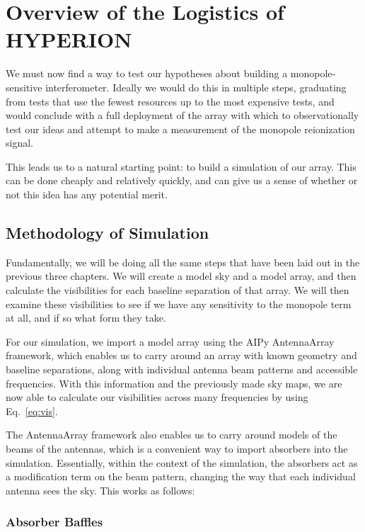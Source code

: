\chapter{Overview of the Logistics of HYPERION}

We must now find a way to test our hypotheses about building a 
monopole-sensitive interferometer. Ideally we would do this in multiple steps, 
graduating from tests that use the fewest resources up to the most expensive 
tests, and would conclude with a full deployment of the array with which to 
observationally test our ideas and attempt to make a measurement of the 
monopole reionization signal. 

This leads us to a natural starting point: to build a simulation of our array.  
This can be done cheaply and relatively quickly, and can give us a sense of 
whether or not this idea has any potential merit.

\section{Methodology of Simulation}

Fundamentally, we will be doing all the same steps that have been laid out in 
the previous three chapters. We will create a model sky and a model array, and 
then calculate the visibilities for each baseline separation of that array. We 
will then examine these visibilities to see if we have any sensitivity to the 
monopole term at all, and if so what form they take.

For our simulation, we import a model array using the AIPy AntennaArray 
framework, which enables us to carry around an array with known geometry and 
baseline separations, along with individual antenna beam patterns and 
accessible frequencies. With this information and the previously made sky maps, 
we are now able to calculate our visibilities across many frequencies by using 
Eq.~\eqref{eq:vis}.

The AntennaArray framework also enables us to carry around models of the beams 
of the antennas, which is a convenient way to import absorbers into the 
simulation. Essentially, within the context of the simulation, the absorbers 
act as a modification term on the beam pattern, changing the way that each 
individual antenna sees the sky. This works as follows:

\subsection{Absorber Baffles}

